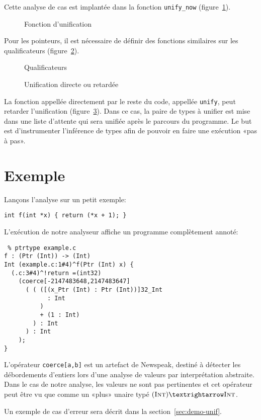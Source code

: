 Cette analyse de cas est implantée dans la fonction \texttt{unify_now}
(figure~\ref{fig:implem-unify-now}).

\begin{figure}
\caption{Fonction d'unification}
\label{fig:implem-unify-now}
\end{figure}

Pour les pointeurs, il est nécessaire de définir des fonctions similaires sur
les qualificateurs (figure~\ref{fig:implem-qualifs}).

\begin{figure}


  \caption{Qualificateurs}
\label{fig:implem-qualifs}

\end{figure}

\begin{figure}


\caption{Unification directe ou retardée}
\label{fig:implem-lazy}
\end{figure}

La fonction appellée directement par le reste du code, appellée \texttt{unify},
peut retarder l'unification (figure~\ref{fig:implem-lazy}). Dans ce cas, la
paire de types à unifier est mise dans une liste d'attente qui sera unifiée
après le parcours du programme. Le but est d'instrumenter l'inférence de types
afin de pouvoir en faire une exécution «pas à pas».

\section{Exemple}

Lançons l'analyse sur un petit exemple:

\begin{verbatim}
int f(int *x) { return (*x + 1); }
\end{verbatim}

L'exécution de notre analyseur affiche un programme complètement annoté:

\begin{verbatim}
 % ptrtype example.c
f : (Ptr (Int)) -> (Int)
Int (example.c:1#4)^f(Ptr (Int) x) {
  (.c:3#4)^!return =(int32)
    (coerce[-2147483648,2147483647]
      ( ( ([(x_Ptr (Int) : Ptr (Int))]32_Int
            : Int
          )
          + (1 : Int)
        ) : Int
      ) : Int
    );
}
\end{verbatim}

L'opérateur \texttt{coerce[a,b]} est un artefact de Newspeak, destiné à détecter
les débordements d'entiers lors d'une analyse de valeurs par interprétation
abstraite. Dans le cas de notre analyse, les valeurs ne sont pas pertinentes et
cet opérateur peut être vu que comme un «plus» unaire typé $(\tInt) → \tInt$.

Un exemple de cas d'erreur sera décrit dans la section~\ref{sec:demo-unif}.



